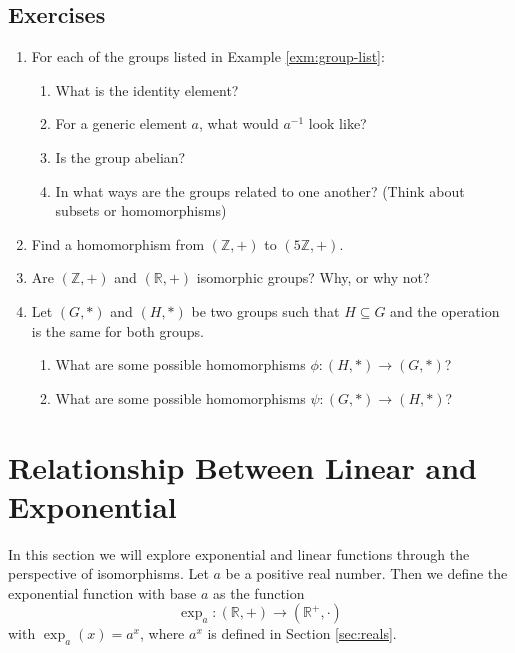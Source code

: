 \documentclass[
]{book}
\theoremstyle{definition}
\theoremstyle{definition}
\theoremstyle{definition}
\theoremstyle{definition}
\theoremstyle{remark}
\begin{document}
\hypertarget{exercises-20}{%
\subsection{Exercises}\label{exercises-20}}

\begin{enumerate}
\def\labelenumi{\arabic{enumi}.}
\item
  For each of the groups listed in Example \ref{exm:group-list}:

  \begin{enumerate}
  \def\labelenumii{\alph{enumii}.}
  \item
    What is the identity element?
  \item
    For a generic element \(a\), what would \(a^{-1}\) look like?
  \item
    Is the group abelian?
  \item
    In what ways are the groups related to one another? (Think about subsets or homomorphisms)
  \end{enumerate}
\item
  Find a homomorphism from \(\left(\mathbb{Z}, +\right)\) to \(\left(5\mathbb{Z}, +\right)\).
\item
  Are \((\mathbb{Z},+)\) and \((\mathbb{R},+)\) isomorphic groups? Why, or why not?
\item
  Let \((G,*)\) and \((H,*)\) be two groups such that \(H\subseteq G\) and the operation is the same for both groups.

  \begin{enumerate}
  \def\labelenumii{\alph{enumii}.}
  \item
    What are some possible homomorphisms \(\phi:(H,*)\rightarrow (G,*)\)?
  \item
    What are some possible homomorphisms \(\psi:(G,*) \rightarrow (H,*)\)?
  \end{enumerate}
\end{enumerate}

\hypertarget{sec:linear-exponential}{%
\section{Relationship Between Linear and Exponential}\label{sec:linear-exponential}}

In this section we will explore exponential and linear functions through the perspective of isomorphisms. Let \(a\) be a positive real number. Then we define the exponential function with base \(a\) as the function \[\exp_a: (\mathbb{R},+) \rightarrow (\mathbb{R}^+,\cdot)\] with \(\exp_a{(x)}= a^x\), where \(a^x\) is defined in Section \ref{sec:reals}.
\end{document}
